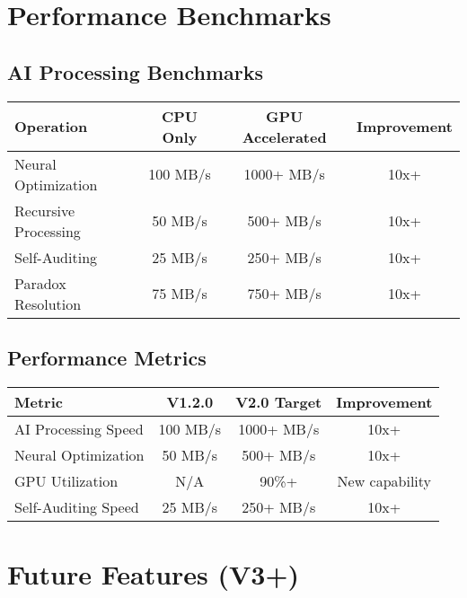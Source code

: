 \documentclass[12pt,a4paper]{article}
\begin{document}
\section{Performance Benchmarks}

\subsection{AI Processing Benchmarks}
\begin{center}
\begin{tabular}{|l|c|c|c|}
\hline
\textbf{Operation} & \textbf{CPU Only} & \textbf{GPU Accelerated} & \textbf{Improvement} \\
\hline
Neural Optimization & 100 MB/s & 1000+ MB/s & 10x+ \\
Recursive Processing & 50 MB/s & 500+ MB/s & 10x+ \\
Self-Auditing & 25 MB/s & 250+ MB/s & 10x+ \\
Paradox Resolution & 75 MB/s & 750+ MB/s & 10x+ \\
\hline
\end{tabular}
\end{center}

\subsection{Performance Metrics}
\begin{center}
\begin{tabular}{|l|c|c|c|}
\hline
\textbf{Metric} & \textbf{V1.2.0} & \textbf{V2.0 Target} & \textbf{Improvement} \\
\hline
AI Processing Speed & 100 MB/s & 1000+ MB/s & 10x+ \\
Neural Optimization & 50 MB/s & 500+ MB/s & 10x+ \\
GPU Utilization & N/A & 90\%+ & New capability \\
Self-Auditing Speed & 25 MB/s & 250+ MB/s & 10x+ \\
\hline
\end{tabular}
\end{center}

\section{Future Features (V3+)}
\end{document}
